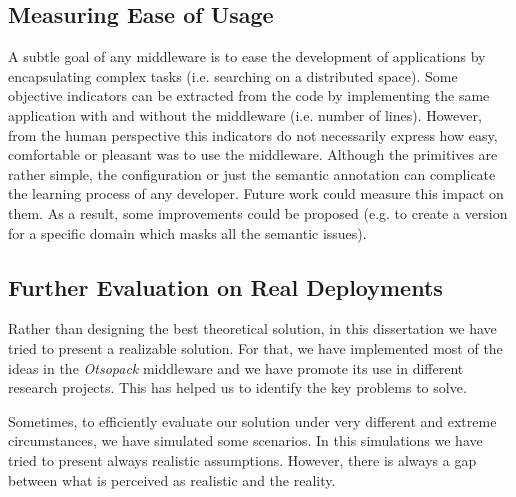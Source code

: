 

\subsection{Measuring Ease of Usage}

A subtle goal of any middleware is to ease the development of applications by encapsulating complex tasks (i.e. searching on a distributed space).
Some objective indicators can be extracted from the code by implementing the same application with and without the middleware (i.e. number of lines).
However, from the human perspective this indicators do not necessarily express how easy, comfortable or pleasant was to use the middleware.
Although the primitives are rather simple, the configuration or just the semantic annotation can complicate the learning process of any developer.
Future work could measure this impact on them.
As a result, some improvements could be proposed (e.g. to create a version for a specific domain which masks all the semantic issues).


\subsection{Further Evaluation on Real Deployments}

Rather than designing the best theoretical solution, in this dissertation we have tried to present a realizable solution.
For that, we have implemented most of the ideas in the \emph{Otsopack} middleware and we have promote its use in different research projects.
This has helped us to identify the key problems to solve.


Sometimes, to efficiently evaluate our solution under very different and extreme circumstances, we have simulated some scenarios. %
In this simulations we have tried to present always realistic assumptions.
However, there is always a gap between what is perceived as realistic and the reality.


